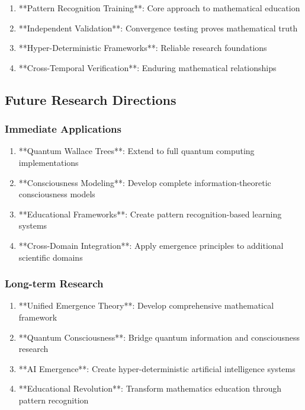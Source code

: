 \documentclass[12pt]{article}
\begin{document}
\begin{enumerate}
    \item **Pattern Recognition Training**: Core approach to mathematical education
    \item **Independent Validation**: Convergence testing proves mathematical truth
    \item **Hyper-Deterministic Frameworks**: Reliable research foundations
    \item **Cross-Temporal Verification**: Enduring mathematical relationships
\end{enumerate}

\subsection{Future Research Directions}

\subsubsection{Immediate Applications}

\begin{enumerate}
    \item **Quantum Wallace Trees**: Extend to full quantum computing implementations
    \item **Consciousness Modeling**: Develop complete information-theoretic consciousness models
    \item **Educational Frameworks**: Create pattern recognition-based learning systems
    \item **Cross-Domain Integration**: Apply emergence principles to additional scientific domains
\end{enumerate}

\subsubsection{Long-term Research}

\begin{enumerate}
    \item **Unified Emergence Theory**: Develop comprehensive mathematical framework
    \item **Quantum Consciousness**: Bridge quantum information and consciousness research
    \item **AI Emergence**: Create hyper-deterministic artificial intelligence systems
    \item **Educational Revolution**: Transform mathematics education through pattern recognition
\end{enumerate}
\end{document}
